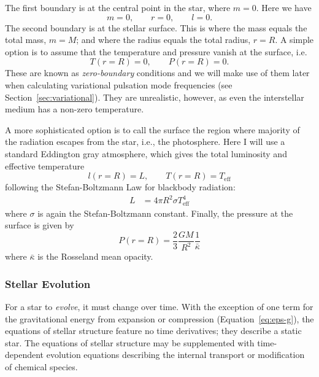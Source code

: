 The first boundary is at the central point in the star, where ${m=0}$.
Here we have %
\begin{equation}
    m=0,\qquad r=0,\qquad l=0.
\end{equation} 
The second boundary is at the stellar surface. %
This is where the mass equals the total mass, ${m=M}$; and where the radius equals the total radius, ${r=R}$. 
A simple option is to assume that the temperature and pressure vanish at the surface, i.e.
\begin{equation} \label{eq:zero}
    T(r=R)=0, \qquad P(r=R)=0.
\end{equation}
These are known as \emph{zero-boundary} conditions and we will make use of them later when calculating variational pulsation mode frequencies (see Section~\ref{sec:variational}). 
They are unrealistic, however, as even the interstellar medium has a non-zero temperature. 

A more sophisticated option is to call the surface the region where majority of the radiation escapes from the star, i.e., the photosphere. 
Here I will use a standard Eddington gray atmosphere, which gives the total luminosity and effective temperature 
\begin{equation}
    l(r=R) = L,\qquad T(r=R) = T_{\text{eff}}
\end{equation}
following the Stefan-Boltzmann Law %
for blackbody radiation: 
\begin{align} \label{eq:stefan-boltzmann} 
    L &= 4\pi R^2 \sigma T_{\text{eff}}^4
\end{align}
where $\sigma$ is again the Stefan-Boltzmann constant. %
Finally, the pressure at the surface is given by 
\begin{equation}
    P(r=R)
    =
    \frac{2}{3} 
    \frac{GM}{R^2}
    \frac{1}{\bar \kappa}
\end{equation}
where $\bar \kappa$ is the Rosseland mean opacity. 




\subsubsection*{Stellar Evolution}
For a star to \emph{evolve}, it must change over time. With the exception of one term for the gravitational energy from expansion or compression (Equation~\ref{eq:eps-g}), the equations of stellar structure feature no time derivatives; %
they describe a static star. 
The equations of stellar structure may be supplemented with time-dependent evolution equations describing the internal transport or modification of chemical species. 

